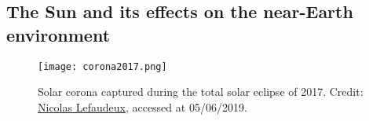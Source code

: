 \documentclass[12pt,a4paper,ruledheader]{report}
\begin{document}
\begin{appendix}
\subsection{The Sun and its effects on the near-Earth environment}
\label{sec:sun}




\begin{figure}[h]
  \begin{center}
    \texttt{[image: corona2017.png]}
    \caption{Solar corona captured during the total solar eclipse of 2017.
      {\footnotesize Credit:}
      \href{https://hdr-astrophotography.com/high-resolution-2017-total-solar-eclipse/}
      {\footnotesize Nicolas Lefaudeux}{\footnotesize , accessed at 05/06/2019}.}
    \label{corona}
  \end{center}
\end{figure}









\end{appendix}




\end{document}
